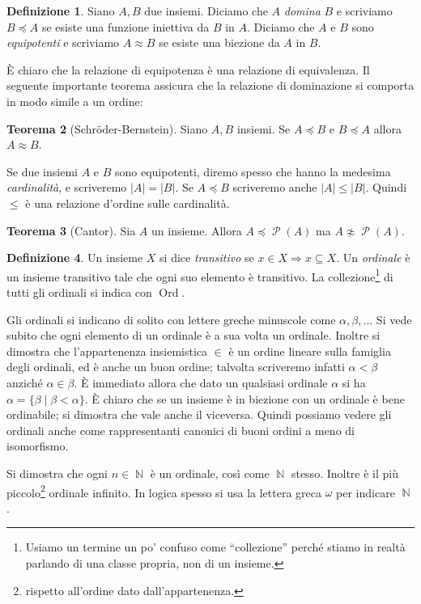 \documentclass[12pt,a4paper]{report}
\theoremstyle{definition}
\newtheorem{teo}{Teorema}[section]  %
\newtheorem{defn}[teo]{Definizione}  %
\theoremstyle{num.custom-title}
\DeclareMathOperator{\PP}{\mathcal{P}}
\DeclareMathOperator{\Ord}{\text{Ord}}
\DeclareMathOperator{\N}{\mathbb{N}}
\DeclareMathOperator{\imp}{\Rightarrow}
\begin{document}
\begin{defn}
Siano $A, B$ due insiemi. Diciamo che $A$ \emph{domina} $B$ e scriviamo $B \preceq A$ se esiste una funzione iniettiva da $B$ in $A$. Diciamo che $A$ e $B$ sono \emph{equipotenti} e scriviamo $A \approx B$ se esiste una biezione da $A$ in $B$.
\end{defn}

È chiaro che la relazione di equipotenza è una relazione di equivalenza. Il seguente importante teorema assicura che la relazione di dominazione si comporta in modo simile a un ordine:

\begin{teo}[Schröder-Bernstein]
Siano $A,B$ insiemi. Se $A \preceq B$ e $B \preceq A$ allora $A \approx B$.
\end{teo}

Se due insiemi $A$ e $B$ sono equipotenti, diremo spesso che hanno la medesima \emph{cardinalità}, e scriveremo $|A|=|B|$. Se $A \preceq B$ scriveremo anche $|A| \leq |B|$. Quindi $\leq$ è una relazione d'ordine sulle cardinalità.

\begin{teo}[Cantor]
Sia $A$ un insieme. Allora $A \preceq \PP(A)$ ma $A \not\approx \PP(A)$.
\end{teo}

\begin{defn}
Un insieme $X$ si dice \emph{transitivo} se $x \in X \imp x \subseteq X$. Un \emph{ordinale} è un insieme transitivo tale che ogni suo elemento è transitivo. La collezione\footnote{Usiamo un termine un po' confuso come ``collezione'' perché stiamo in realtà parlando di una classe propria, non di un insieme.} di tutti gli ordinali si indica con $\Ord$.
\end{defn}

Gli ordinali si indicano di solito con lettere greche minuscole come $\alpha, \beta,...$ Si vede subito che ogni elemento di un ordinale è a sua volta un ordinale. Inoltre si dimostra che l'appartenenza insiemistica $\in$ è un ordine lineare sulla famiglia degli ordinali, ed è anche un buon ordine; talvolta scriveremo infatti $\alpha < \beta$ anziché $\alpha \in \beta$. È immediato allora che dato un qualsiasi ordinale $\alpha$ si ha $\alpha=\{\beta \mid \beta < \alpha\}$. È chiaro che se un insieme è in biezione con un ordinale è bene ordinabile; si dimostra che vale anche il viceversa. Quindi possiamo vedere gli ordinali anche come rappresentanti canonici di buoni ordini a meno di isomorfismo.

Si dimostra che ogni $n \in \N$ è un ordinale, così come $\N$ stesso. Inoltre è il più piccolo\footnote{rispetto all'ordine dato dall'appartenenza.} ordinale infinito. In logica spesso si usa la lettera greca $\omega$ per indicare $\N$.
\end{document}
